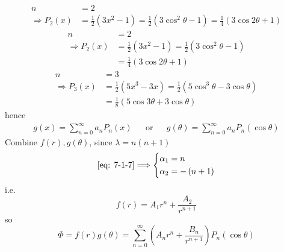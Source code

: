 \begin{align*}
n&=2\\
\Longrightarrow 
P_2(x)&=\frac{1}{2}\left(3x^2-1\right) = \frac{1}{2}\left(3\cos^2\theta -1\right) = \frac{1}{4}\left(3\cos 2\theta +1\right)
\end{align*}
\begin{align*}
n&=2\\
\Longrightarrow 
P_2(x)&=\frac{1}{2}\left(3x^2-1\right) = \frac{1}{2}\left(3\cos^2\theta -1\right)\\ 
&= \frac{1}{4}\left(3\cos 2\theta +1\right)
\end{align*}
\begin{align*}
n&=3\\
\Longrightarrow 
P_3(x)&=\frac{1}{2}\left(5x^3-3x\right) = \frac{1}{2}\left(5\cos^3\theta -3\cos\theta\right)\\ 
&= \frac{1}{8}\left(5\cos 3\theta +3\cos\theta\right)
\end{align*}
hence 
\begin{align*}
g(x) = \sum_{n=0}^\infty a_n P_n(x)&&\text{or}&&g(\theta) = \sum_{n=0}^\infty a_n P_n(\cos\theta)
\end{align*}
Combine $f(r),g(\theta)$, since $\lambda= n\left(n+1\right)$
\[
\eqref{eq: 7-1-7}\Longrightarrow
\left\{
\begin{aligned}
\alpha_1 &= n \\
\alpha_2 &= -\left(n+1\right)
\end{aligned}
\right.
\]
i.e.
\[
f(r) = A_1r^n + \frac{A_2}{r^{n+1}}
\]
so
\begin{equation}
\Phi = f(r)g(\theta) = \boxed{\sum_{n=0}^\infty\left(A_nr^n + \frac{B_n}{r^{n+1}}\right)P_n(\cos\theta)}
\label{eq: 7-1-15}
\end{equation}
